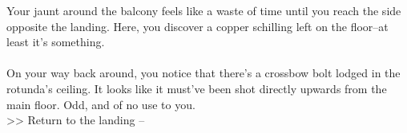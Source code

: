 Your jaunt around the balcony feels like a waste of time until you reach the side opposite the landing. Here, you discover a copper schilling left on the floor--at least it's something.\\
\\

On your way back around, you notice that there's a crossbow bolt lodged in the rotunda's ceiling. It looks like it must've been shot directly upwards from the main floor. Odd, and of no use to you.\\

>> Return to the landing -- 